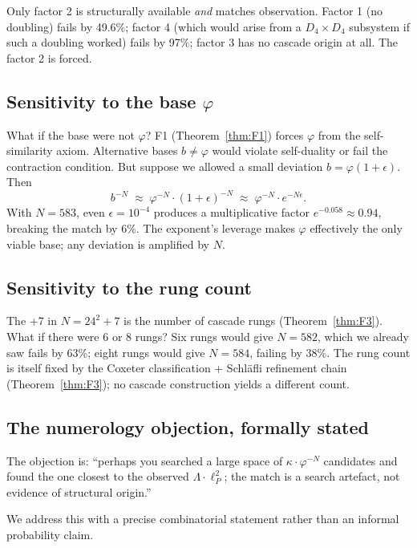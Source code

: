 \documentclass[11pt]{article}
\theoremstyle{plain}
\theoremstyle{definition}
\theoremstyle{remark}
\begin{document}
Only factor 2 is structurally available \emph{and} matches observation. Factor 1 (no doubling) fails by 49.6\%; factor 4 (which would arise from a $D_4 \times D_4$ subsystem if such a doubling worked) fails by 97\%; factor 3 has no cascade origin at all. The factor 2 is forced.

\subsection{Sensitivity to the base $\varphi$}

What if the base were not $\varphi$? F1 (Theorem~\ref{thm:F1}) forces $\varphi$ from the self-similarity axiom. Alternative bases $b \ne \varphi$ would violate self-duality or fail the contraction condition. But suppose we allowed a small deviation $b = \varphi(1 + \epsilon)$. Then
\[
  b^{-N} \;\approx\; \varphi^{-N} \cdot (1 + \epsilon)^{-N} \;\approx\; \varphi^{-N} \cdot e^{-N \epsilon}.
\]
With $N = 583$, even $\epsilon = 10^{-4}$ produces a multiplicative factor $e^{-0.058} \approx 0.94$, breaking the match by 6\%. The exponent's leverage makes $\varphi$ effectively the only viable base; any deviation is amplified by $N$.

\subsection{Sensitivity to the rung count}

The +7 in $N = 24^2 + 7$ is the number of cascade rungs (Theorem~\ref{thm:F3}). What if there were 6 or 8 rungs? Six rungs would give $N = 582$, which we already saw fails by 63\%; eight rungs would give $N = 584$, failing by $38\%$. The rung count is itself fixed by the Coxeter classification + Schl\"afli refinement chain (Theorem~\ref{thm:F3}); no cascade construction yields a different count.

\subsection{The numerology objection, formally stated}\label{sec:uniqueness-numerology}

The objection is: ``perhaps you searched a large space of $\kappa \cdot \varphi^{-N}$ candidates and found the one closest to the observed $\Lambda \cdot \ell_P^2$; the match is a search artefact, not evidence of structural origin.''

We address this with a precise combinatorial statement rather than an informal probability claim.
\end{document}
